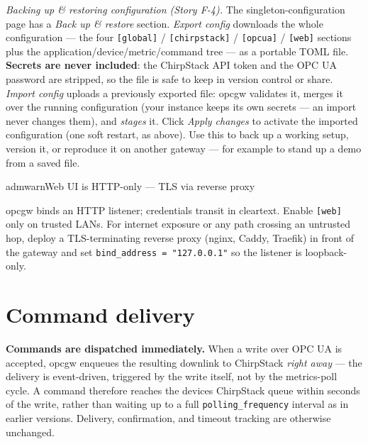 \emph{Backing up \& restoring configuration (Story F-4).} The singleton-configuration page has a \emph{Back up \& restore} section. \emph{Export config} downloads the whole configuration --- the four \texttt{{[}global{]}} / \texttt{{[}chirpstack{]}} / \texttt{{[}opcua{]}} / \texttt{{[}web{]}} sections plus the application/device/metric/command tree --- as a portable TOML file. \textbf{Secrets are never included}: the ChirpStack API token and the OPC UA password are stripped, so the file is safe to keep in version control or share. \emph{Import config} uploads a previously exported file: opcgw validates it, merges it over the running configuration (your instance keeps its own secrets --- an import never changes them), and \emph{stages} it. Click \emph{Apply changes} to activate the imported configuration (one soft restart, as above). Use this to back up a working setup, version it, or reproduce it on another gateway --- for example to stand up a demo from a saved file.

\begin{admonition}{admwarn}{Web UI is HTTP-only --- TLS via reverse proxy}

opcgw binds an HTTP listener; credentials transit in cleartext. Enable \texttt{{[}web{]}} only on trusted LANs. For internet exposure or any path crossing an untrusted hop, deploy a TLS-terminating reverse proxy (nginx, Caddy, Traefik) in front of the gateway and set \texttt{bind\_address\ =\ "127.0.0.1"} so the listener is loopback-only.

\end{admonition}

\section{Command delivery}\label{sec-command-delivery-config}

\textbf{Commands are dispatched immediately.} When a write over OPC UA is accepted, opcgw enqueues the resulting downlink to ChirpStack \emph{right away} --- the delivery is event-driven, triggered by the write itself, not by the metrics-poll cycle. A command therefore reaches the device\textquotesingle s ChirpStack queue within seconds of the write, rather than waiting up to a full \texttt{polling\_frequency} interval as in earlier versions. Delivery, confirmation, and timeout tracking are otherwise unchanged.

